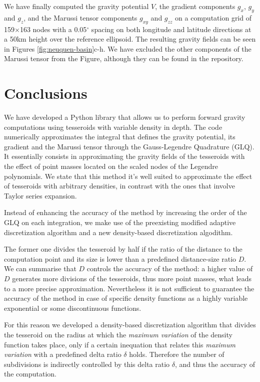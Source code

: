 \documentclass[extra]{gji}
\begin{document}
We have finally computed the gravity potential $V$, the gradient components $g_x$, $g_y$ and $g_z$, and the Marussi tensor components $g_{xy}$ and $g_{zz}$ on a computation grid of 159$\times$163 nodes with a 0.05$^\circ$ spacing on both longitude and latitude directions at a 50km height over the reference ellipsoid.
The resulting gravity fields can be seen in Figures \ref{fig:neuquen-basin}c-h.
We have excluded the other components of the Marussi tensor from the Figure, although they can be found in the repository.



\section{Conclusions}

We have developed a Python library that allows us to perform forward gravity computations using tesseroids with variable density in depth.
The code numerically approximates the integral that defines the gravity potential, its gradient and the Marussi tensor through the Gauss-Legendre Quadrature (GLQ).
It essentially consists in approximating the gravity fields of the tesseroids with the effect of point masses located on the scaled nodes of the Legendre polynomials.
We state that this method it's well suited to approximate the effect of tesseroids with arbitrary densities, in contrast with the ones that involve Taylor series expansion.

Instead of enhancing the accuracy of the method by increasing the order of the GLQ on each integration, we make use of the preexisting modified adaptive discretization algorithm and a new density-based discretization algodithm.

The former one divides the tesseroid by half if the ratio of the distance to the computation point and its size is lower than a predefined distance-size ratio $D$.
We can summarise that $D$ controls the accuracy of the method: a higher value of $D$ generates more divisions of the tesseroids, thus more point masses, what leads to a more precise approximation.
Nevertheless it is not sufficient to guarantee the accuracy of the method in case of specific density functions as a highly variable exponential or some discontinuous functions.

For this reason we developed a density-based discretization algorithm that divides the tesseroid on the radius at which the \emph{maximum variation} of the density function takes place, only if a certain inequation that relates this \emph{maximum variation} with a predefined delta ratio $\delta$ holds.
Therefore the number of subdivisions is indirectly controlled by this delta ratio $\delta$, and thus the accuracy of the computation.
\end{document}
